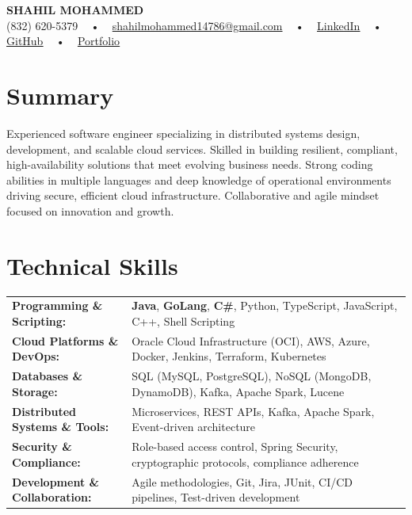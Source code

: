 \documentclass[letterpaper,11pt]{article}
\begin{document}
\begin{center}
    {\fontsize{14pt}{12pt}\selectfont \textbf{\MakeUppercase{Shahil Mohammed}}}\\ \vspace{2pt}
    \fontsize{10pt}{12pt}\selectfont (832) 620-5379 ~ • ~ \href{mailto:shahilmohammed14786@gmail.com}{shahilmohammed14786@gmail.com} ~ • ~  
    \href{https://www.linkedin.com/in/shahil-mohammed-9652931a1/}{\color{blue}\underline{LinkedIn}}  ~ • ~ 
    \href{https://github.com/freakbeast14}{\color{blue}\underline{GitHub}} ~ • ~ 
    \href{https://shahil-mohammed.netlify.app/}{\color{blue}\underline{Portfolio}}
    \vspace{-8pt}
\end{center}

\section{Summary}
\fontsize{9pt}{10pt}\selectfont
Experienced software engineer specializing in distributed systems design, development, and scalable cloud services. Skilled in building resilient, compliant, high-availability solutions that meet evolving business needs. Strong coding abilities in multiple languages and deep knowledge of operational environments driving secure, efficient cloud infrastructure. Collaborative and agile mindset focused on innovation and growth.
 \vspace{-5pt}
 
\section{Technical Skills}
        \vspace{-14pt}
        \begin{table}[h]
            \fontsize{9pt}{10pt}\selectfont
            \begin{tabular}{p{0.3\linewidth} p{0.7\linewidth}}
                \textbf{Programming \& Scripting:} & \textbf{Java}, \textbf{GoLang}, \textbf{C\#}, Python, TypeScript, JavaScript, C++, Shell Scripting \\
                \textbf{Cloud Platforms \& DevOps:} & Oracle Cloud Infrastructure (OCI), AWS, Azure, Docker, Jenkins, Terraform, Kubernetes \\
                \textbf{Databases \& Storage:} & SQL (MySQL, PostgreSQL), NoSQL (MongoDB, DynamoDB), Kafka, Apache Spark, Lucene \\
                \textbf{Distributed Systems \& Tools:} & Microservices, REST APIs, Kafka, Apache Spark, Event-driven architecture \\
                \textbf{Security \& Compliance:} & Role-based access control, Spring Security, cryptographic protocols, compliance adherence \\
                \textbf{Development \& Collaboration:} & Agile methodologies, Git, Jira, JUnit, CI/CD pipelines, Test-driven development \\
            \end{tabular}
        \end{table}
 \vspace{-15pt}
 
\end{document}
